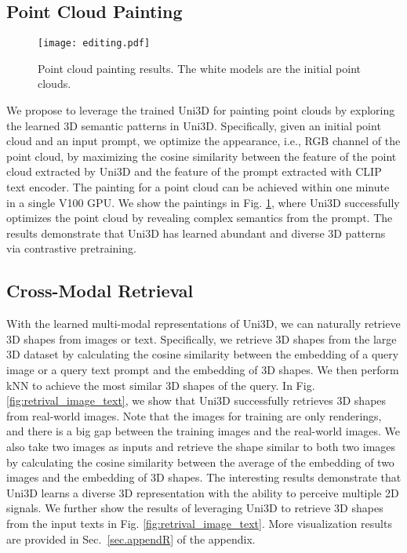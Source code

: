 \documentclass{article} \usepackage{iclr2024_conference,times}
\def\Ours{Uni3D\xspace}
\begin{document}
\subsection{Point Cloud Painting}

\begin{figure}[tb]
    \centering
    \texttt{[image: editing.pdf]}
    \vspace{-0.3cm}
    \caption{Point cloud painting results. The white models are the initial point clouds.}
    \label{fig:editing}
    \vspace{-0.2cm}
\end{figure}

We propose to leverage the trained \Ours for painting point clouds by exploring the learned 3D semantic patterns in \Ours. Specifically, given an initial point cloud and an input prompt, we optimize the appearance, i.e., RGB channel of the point cloud, by maximizing the cosine similarity between the feature of the point cloud extracted by Uni3D and the feature of the prompt extracted with CLIP text encoder. The painting for a point cloud can be achieved within one minute in a single V100 GPU. We show the paintings in Fig. \ref{fig:editing}, where \Ours successfully optimizes the point cloud by revealing complex semantics from the prompt. The results demonstrate that \Ours has learned abundant and diverse 3D patterns via contrastive pretraining.

\subsection{Cross-Modal Retrieval}
With the learned multi-modal representations of \Ours, we can naturally retrieve 3D shapes from images or text. Specifically, we retrieve 3D shapes from the large 3D dataset \citep{deitke2023objaverse} by calculating the cosine similarity between the embedding of a query image or a query text prompt and the embedding of 3D shapes. We then perform kNN to achieve the most similar 3D shapes of the query. In Fig. \ref{fig:retrival_image_text}, we show that \Ours successfully retrieves 3D shapes from real-world images. Note that the images for training are only renderings, and there is a big gap between the training images and the real-world images. We also take two images as inputs and retrieve the shape similar to both two images by calculating the cosine similarity between the average of the embedding of two images and the embedding of 3D shapes. The interesting results demonstrate that \Ours learns a diverse 3D representation with the ability to perceive multiple 2D signals. We further show the results of leveraging \Ours to retrieve 3D shapes from the input texts in Fig. \ref{fig:retrival_image_text}. More visualization results are provided in Sec.~\ref{sec.appendR} of the appendix.
\end{document}
